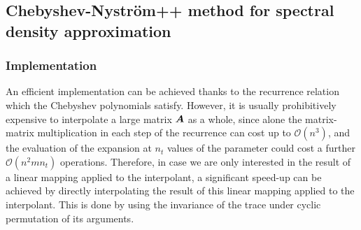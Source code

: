 \documentclass[12pt]{article}
\begin{document}
\subsection{Chebyshev-Nyström++ method for spectral density approximation}
\label{subsec:chebyshev-nystrom}



\subsubsection{Implementation}
\label{subsubsec:chebyshev-nystrom-implementation}

An efficient implementation can be achieved thanks to the recurrence relation  which the Chebyshev polynomials satisfy. However, it is usually prohibitively expensive to interpolate a large matrix $\boldsymbol{A}$ as a whole, since alone the matrix-matrix multiplication in each step of the recurrence can cost up to $\mathcal{O}(n^3)$, and the evaluation of the expansion at $n_t$ values of the parameter could cost a further $\mathcal{O}(n^2 m n_t)$ operations. Therefore, in case we are only interested in the result of a linear mapping applied to the interpolant, a significant speed-up can be achieved by directly interpolating the result of this linear mapping applied to the interpolant. This is done by using the invariance of the trace under cyclic permutation of its arguments. 

\end{document}
